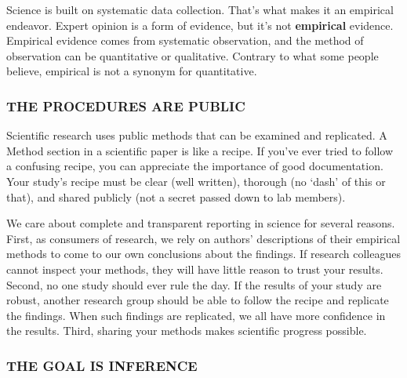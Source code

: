 \documentclass[
  letterpaper,
  DIV=11,
  numbers=noendperiod,
  oneside]{scrartcl}
\begin{document}

Science is built on systematic data collection. That's what makes it an
empirical endeavor. Expert opinion is a form of evidence, but it's not
\textbf{empirical} evidence. Empirical evidence comes from systematic
observation, and the method of observation can be quantitative or
qualitative. Contrary to what some people believe, empirical is not a
synonym for quantitative.

\hypertarget{the-procedures-are-public}{%
\subsubsection*{THE PROCEDURES ARE
PUBLIC}\label{the-procedures-are-public}}

Scientific research uses public methods that can be examined and
replicated. A Method section in a scientific paper is like a recipe. If
you've ever tried to follow a confusing recipe, you can appreciate the
importance of good documentation. Your study's recipe must be clear
(well written), thorough (no `dash' of this or that), and shared
publicly (not a secret passed down to lab members).

We care about complete and transparent reporting in science for several
reasons. First, as consumers of research, we rely on authors'
descriptions of their empirical methods to come to our own conclusions
about the findings. If research colleagues cannot inspect your methods,
they will have little reason to trust your results. Second, no one study
should ever rule the day. If the results of your study are robust,
another research group should be able to follow the recipe and replicate
the findings. When such findings are replicated, we all have more
confidence in the results. Third, sharing your methods makes scientific
progress possible.

\hypertarget{the-goal-is-inference}{%
\subsubsection*{THE GOAL IS INFERENCE}\label{the-goal-is-inference}}
\end{document}
